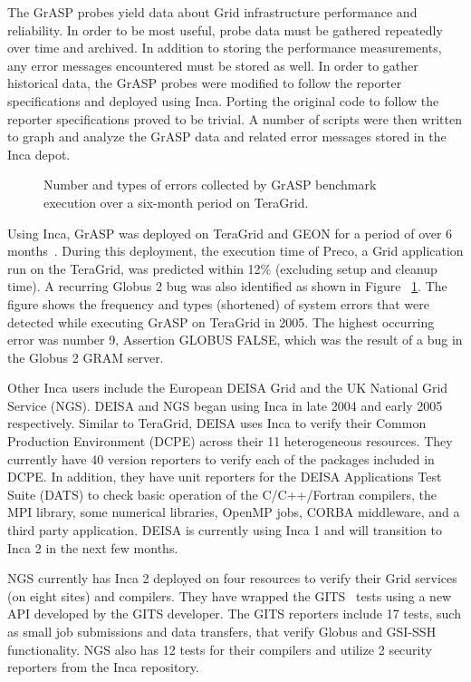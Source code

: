 \documentclass[times,10pt,twocolumn]{article}
\begin{document}
The GrASP probes yield data about Grid infrastructure performance and reliability.
In order to be most useful, probe data must be gathered 
repeatedly over time and archived.
In addition to storing the performance measurements,
any error messages encountered must be stored as well.    
In order to
gather historical data, the GrASP probes were modified
to follow the reporter specifications and deployed using Inca.
Porting the original code to follow the reporter specifications proved to be
trivial.  A number of scripts were then written to graph and analyze the GrASP
data and related error messages stored in the Inca depot.  

\begin{figure}[tbp]
  \centering
  \mbox{}
  \caption{\label{errorHist_fig} Number and types of errors collected by
  GrASP benchmark execution over a six-month period on TeraGrid.}
\end{figure}

Using Inca, GrASP was deployed on TeraGrid and GEON for a period of over 6
months~\cite{grasp2}.  During this deployment, the execution time of Preco, 
a Grid application run on the TeraGrid, was predicted within 12\% (excluding setup and cleanup time).
A recurring Globus 2 bug was also identified as shown in Figure ~\ref{errorHist_fig}.  The figure shows the frequency and types (shortened) of 
system errors that were detected while executing 
GrASP on TeraGrid in 2005. The highest occurring
error was number 9, Assertion GLOBUS FALSE, which was the result of a bug in
the Globus 2 GRAM server.  


Other Inca users include the European DEISA Grid and the UK National Grid
Service (NGS).  DEISA and NGS began using Inca in late 2004 and early 2005 respectively.  
Similar to TeraGrid, DEISA uses Inca to verify their Common
Production Environment (DCPE) across their 11 heterogeneous resources.  They
currently have 40 version reporters to verify each of the packages included in
DCPE.  In addition, they have unit reporters for the DEISA Applications Test
Suite (DATS) to check basic operation of the C/C++/Fortran compilers, the MPI
library, some numerical libraries, OpenMP jobs, CORBA middleware, and a third
party application.  DEISA is currently using Inca 1 and will transition to
Inca 2 in the next few months.

NGS currently has Inca 2 deployed on four resources to verify their Grid services (on eight sites) and compilers.  They have wrapped the GITS~\cite{gits} tests using a new
API developed by the GITS developer.  The GITS reporters include 17 tests, 
such as small job submissions and data transfers, that verify Globus and GSI-SSH functionality.
NGS also has 12 tests for their compilers and
utilize 2 security reporters from the Inca repository.
\end{document}
